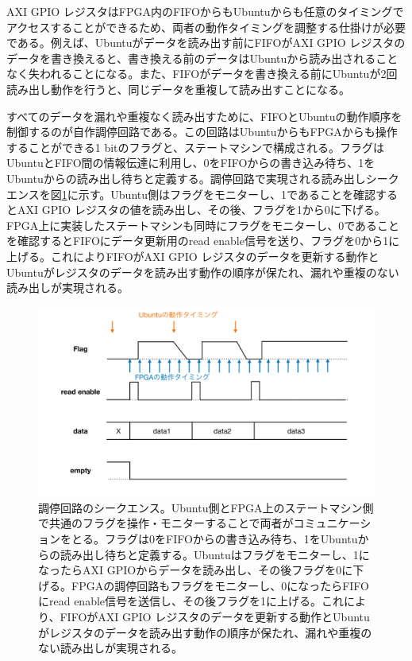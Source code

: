 AXI GPIO レジスタはFPGA内のFIFOからもUbuntuからも任意のタイミングでアクセスすることができるため、両者の動作タイミングを調整する仕掛けが必要である。例えば、Ubuntuがデータを読み出す前にFIFOがAXI GPIO レジスタのデータを書き換えると、書き換える前のデータはUbuntuから読み出されることなく失われることになる。また、FIFOがデータを書き換える前にUbuntuが2回読み出し動作を行うと、同じデータを重複して読み出すことになる。

すべてのデータを漏れや重複なく読み出すために、FIFOとUbuntuの動作順序を制御するのが自作調停回路である。この回路はUbuntuからもFPGAからも操作することができる1 bitのフラグと、ステートマシンで構成される。フラグはUbuntuとFIFO間の情報伝達に利用し、0をFIFOからの書き込み待ち、1をUbuntuからの読み出し待ちと定義する。調停回路で実現される読み出しシークエンスを図\ref{JATHubarbitation}に示す。Ubuntu側はフラグをモニターし、1であることを確認するとAXI GPIO レジスタの値を読み出し、その後、フラグを1から0に下げる。FPGA上に実装したステートマシンも同時にフラグをモニターし、0であることを確認するとFIFOにデータ更新用のread enable信号を送り、フラグを0から1に上げる。これによりFIFOがAXI GPIO レジスタのデータを更新する動作とUbuntuがレジスタのデータを読み出す動作の順序が保たれ、漏れや重複のない読み出しが実現される。

\begin{figure} 
\centering
\includegraphics[width=16cm]{fig/QAQC/JATHubarbitation.pdf}
\caption[調停回路のシークエンス]{調停回路のシークエンス。Ubuntu側とFPGA上のステートマシン側で共通のフラグを操作・モニターすることで両者がコミュニケーションをとる。フラグは0をFIFOからの書き込み待ち、1をUbuntuからの読み出し待ちと定義する。Ubuntuはフラグをモニターし、1になったらAXI GPIOからデータを読み出し、その後フラグを0に下げる。FPGAの調停回路もフラグをモニターし、0になったらFIFOにread enable信号を送信し、その後フラグを1に上げる。これにより、FIFOがAXI GPIO レジスタのデータを更新する動作とUbuntuがレジスタのデータを読み出す動作の順序が保たれ、漏れや重複のない読み出しが実現される。}
\label{JATHubarbitation}
\end{figure}

